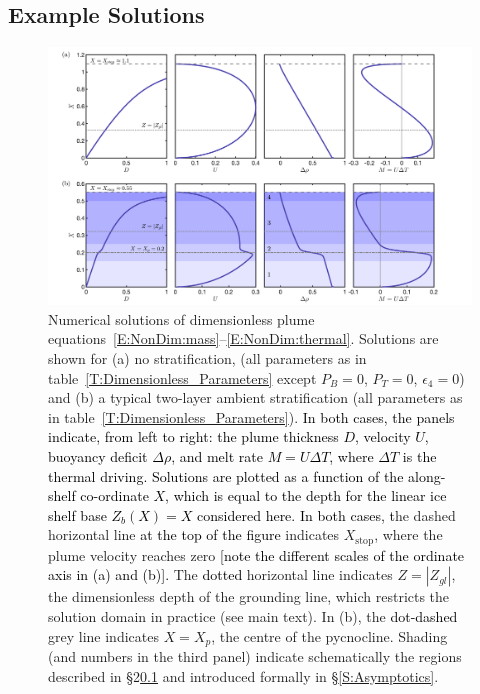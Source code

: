 \documentclass[openacc]{rsproca_new}%
\newcommand{\red}[1]{{\color{red} #1}}
\newcommand{\blue}[1]{{\color{blue} #1}}
\newcommand{\rout}[1]{\red{\st{#1}}}\newcommand{\ab}[1]{\textcolor{Green}{#1}}\newcommand{\about}[1]{\textcolor{Cyan}{\sout{#1}}}
\renewcommand{\rout}[1]{{}} %
\renewcommand{\blue}[1]{{\textcolor{black}{#1}}} %
\renewcommand{\red}[1]{{}} %
\newcommand{\epsfour}{\epsilon_{4}}
\newcommand{\Pb}{\textit{P}_B}  %
\newcommand{\Pt}{\textit{P}_T}
\begin{document}
\subsection{Example Solutions}\label{S:ExampleSolutions}

\begin{figure}
\centering
\includegraphics[width = \textwidth]{./make_plots/plots/figure3.png}
\caption{Numerical solutions of dimensionless plume equations~\eqref{E:NonDim:mass}--\eqref{E:NonDim:thermal}. Solutions are shown for (a) no stratification, (all parameters as in table~\ref{T:Dimensionless_Parameters} except $\Pb = 0$, $\Pt = 0$, $\epsfour = 0$) and (b)  a typical two-layer ambient stratification (all parameters as in table~\ref{T:Dimensionless_Parameters}). \blue{In both cases, the panels indicate, from left to right: the plume thickness $D$, velocity $U$, buoyancy deficit $\Delta \rho$, and melt rate $M = U \Delta T$, where $\Delta T$ is the thermal driving. Solutions are plotted as a function of the along-shelf co-ordinate $X$, which is equal to the depth for the linear ice shelf base $Z_b(X) = X$ considered here.} \rout{Here we take a linear ice shelf base, $Z_b(X) = X$. }\blue{In both cases, t}\rout{T}he dashed horizontal line \blue{at the top of the figure} indicates $X_{\text{stop}}$, where the plume velocity reaches zero \blue{[note the different scales of the ordinate axis in (a) and (b)].} The \rout{dot-dashed} \blue{dotted} horizontal line indicates $Z = |Z_{gl}|$, the dimensionless depth of the grounding line, which restricts the solution domain in practice (see main text). In (b), the \rout{solid }\blue{dot-dashed} grey line indicates $X = X_p$, the centre of the pycnocline. Shading (and numbers in the third panel) indicate schematically the regions described in \S2\ref{S:ExampleSolutions} and introduced formally in \S\ref{S:Asymptotics}. }\label{fig:ExampleSols}
\end{figure}
\end{document}
